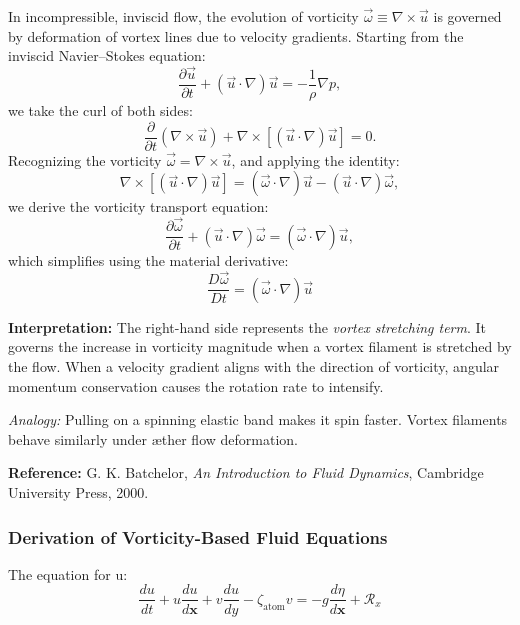 \documentclass[a4paper,12pt]{article}
\begin{document}
\begin{tcolorbox}[title=Vortex Stretching in Inviscid Æther Flow, colframe=blue!50!black, colback=blue!5!white, coltitle=white, fonttitle=\bfseries,
    sharp corners=south]
In incompressible, inviscid flow, the evolution of vorticity \( \vec{\omega} \equiv \nabla \times \vec{u} \) is governed by deformation of vortex lines due to velocity gradients. Starting from the inviscid Navier--Stokes equation:
\[
\frac{\partial \vec{u}}{\partial t} + (\vec{u} \cdot \nabla)\vec{u} = -\frac{1}{\rho} \nabla p,
\]
we take the curl of both sides:
\[
\frac{\partial}{\partial t} (\nabla \times \vec{u}) + \nabla \times \left[ (\vec{u} \cdot \nabla)\vec{u} \right] = 0.
\]
Recognizing the vorticity \( \vec{\omega} = \nabla \times \vec{u} \), and applying the identity:
\[
\nabla \times \left[ (\vec{u} \cdot \nabla)\vec{u} \right] = (\vec{\omega} \cdot \nabla)\vec{u} - (\vec{u} \cdot \nabla)\vec{\omega},
\]
we derive the vorticity transport equation:
\[
\frac{\partial \vec{\omega}}{\partial t} + (\vec{u} \cdot \nabla)\vec{\omega} = (\vec{\omega} \cdot \nabla)\vec{u},
\]
which simplifies using the material derivative:
\begin{equation}
\boxed{ \frac{D \vec{\omega}}{D t} = (\vec{\omega} \cdot \nabla)\vec{u} }
\end{equation}

\textbf{Interpretation:} The right-hand side represents the \emph{vortex stretching term}. It governs the increase in vorticity magnitude when a vortex filament is stretched by the flow. When a velocity gradient aligns with the direction of vorticity, angular momentum conservation causes the rotation rate to intensify.

\medskip

\textit{Analogy:} Pulling on a spinning elastic band makes it spin faster. Vortex filaments behave similarly under æther flow deformation.

\begin{flushright}
    \textbf{Reference:} G. K. Batchelor, \textit{An Introduction to Fluid Dynamics}, Cambridge University Press, 2000.
\end{flushright}
\end{tcolorbox}


    \subsubsection{Derivation of Vorticity-Based Fluid Equations}
    The equation for u:
    \begin{equation}
        \frac{d u}{d t}+u \frac{d u}{d \boldsymbol{x}}+v \frac{d u}{d y}-\zeta_{\text {atom}} v=-g \frac{d \eta}{d \boldsymbol{x}}+\mathcal{R}_x\label{eq:momentum_u}
    \end{equation}
\end{document}
